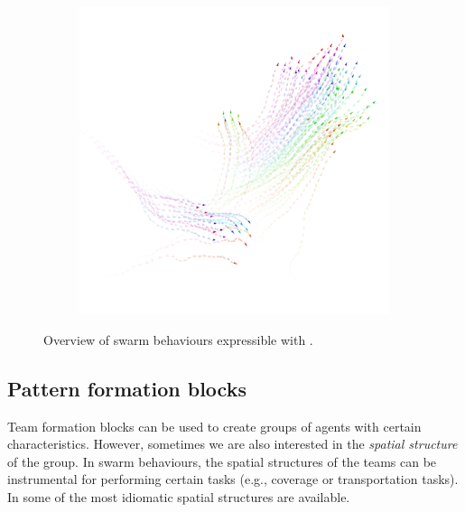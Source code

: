 \begin{figure}[t]
\begin{subfigure}{0.32\textwidth}
  \caption{}
  \label{coordination2023-macro:fig:obstacle-avoidance}
\end{subfigure}
~
\begin{subfigure}{0.32\textwidth}
  \centering
  {\includegraphics[width=\textwidth]{papers/coordination2023-macro/images/flock.png}}
  \caption{}
  \label{coordination2023-macro:fig:flock}
\end{subfigure}
\caption{Overview of swarm behaviours expressible with \MacroSwarm{}.}\label{coordination2023-macro:fig:movement-overview}
\end{figure}

\subsection{Pattern formation blocks}\label{coordination2023-macro:subsec:pattern}
Team formation blocks can be used to create groups of agents with certain characteristics.
%
However, sometimes we are also interested in the \emph{spatial structure} of the group. 
%
In swarm behaviours, the spatial structures of the teams can be instrumental for performing certain tasks (e.g., coverage or transportation tasks).
% 
In \MacroSwarm{} some of the most idiomatic spatial structures are available. 
%

